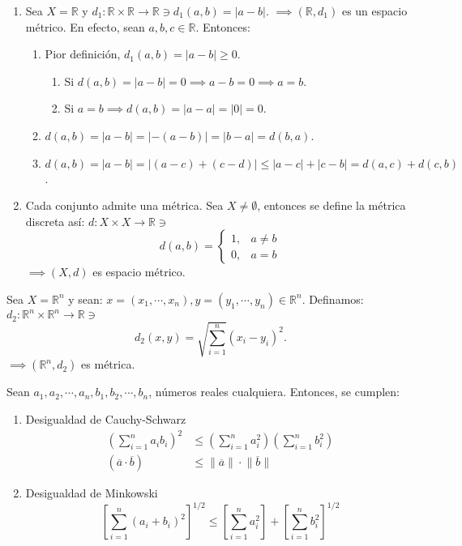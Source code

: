 \begin{ejemplo}
	\begin{enumerate}
		\item Sea $X=\mathbb{R}$ y $d_1:\mathbb{R}\times \mathbb{R}\to \mathbb{R}\ni d_1(a,b)=|a-b|$. $\implies (\mathbb{R},d_1)$ es un espacio métrico. En efecto, sean $a,b,c\in \mathbb{R}$. Entonces: 
		\begin{enumerate}
			\item Pior definición, $d_1(a,b)=|a-b|\geq 0$. 
			\begin{enumerate}
				\item Si $d(a,b)= |a-b|=0\implies a-b=0\implies a=b$. 
				\item Si $a=b\implies d(a,b)=|a-a|=|0|=0$.
			\end{enumerate}
			\item $d(a,b)=|a-b|=|-(a-b)|=|b-a|=d(b,a)$.
			\item $d(a,b)=|a-b|=|(a-c)+(c-d)|\leq |a-c|+|c-b|=d(a,c)+d(c,b)$.
		\end{enumerate}
	\item Cada conjunto admite una métrica. Sea $X\neq \emptyset$, entonces se define la métrica discreta así: $d:X\times X\to \mathbb{R}\ni$ 
	$$d(a,b)=\begin{cases}1, & a\neq b\\ 0, & a=b\end{cases}$$
	$\implies (X,d)$ es espacio métrico.  
	\end{enumerate}
\end{ejemplo}

\begin{ejemplo}
	Sea $X=\mathbb{R}^n$ y sean: 
	$x=(x_1,\cdots, x_n), y=(y_1,\cdots, y_n)\in \mathbb{R}^n$. Definamos: $d_2:\mathbb{R}^n\times \mathbb{R}^n\to \mathbb{R}\ni$ 
$$d_2(x,y)=\sqrt{\sum_{i=1}^{n}}\left(x_i-y_i\right)^2.$$
$\implies (\mathbb{R}^n, d_2)$ es métrica. 
\end{ejemplo}

\begin{lema}
	Sean $a_1,a_2,\cdots, a_n, b_1,b_2, \cdots, b_n$, números reales cualquiera. Entonces, se cumplen: 
	\begin{enumerate}
		\item Desigualdad de Cauchy-Schwarz
		\begin{align*}
			\left(\sum_{i=1}^{n}a_ib_i\right)^2&\leq \left(\sum_{i=1}^{n}a_i^2\right)\left(\sum_{i=1}^{n}b_i^2\right)\\
			(\overline{a}\cdot \overline{b})&\leq \lVert \overline{a} \rVert\cdot \lVert \overline{b} \rVert
		\end{align*}
	\item Desigualdad de Minkowski 
	$$\left[\sum_{i=1}^n (a_i+b_i)^2\right]^{1/2}\leq \left[\sum_{i=1}^{n}a_i^2\right]+\left[\sum_{i=1}^n b_i^2\right]^{1/2}$$
	\end{enumerate}
\end{lema}

